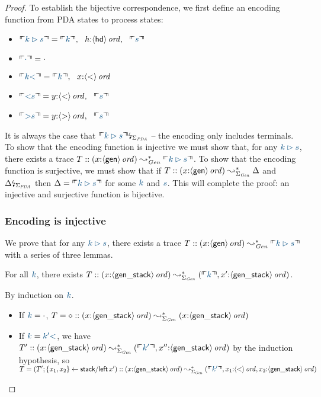 \begin{proof}To establish the bijective correspondence, we first define
an encoding function from PDA states to process states:
\smallskip
\begin{itemize}
\item $\ctxinterp{k \rhd s} = 
  \ctxinterp{k}, ~~
  h{:}\istrue{\susp{\sf hd}}, ~~
  \ctxinterp{s}$
\item $\ctxinterp{\cdot} = \cdot$
\item $\ctxinterp{k{\sf <}} = \ctxinterp{k}, ~~ x{:}\istrue{\susp{\sf <}}$
\item $\ctxinterp{{\sf <}s} = y{:}\istrue{\susp{\sf <}}, ~~ \ctxinterp{s}$
\item $\ctxinterp{{\sf >}s} = y{:}\istrue{\susp{\sf >}}, ~~ \ctxinterp{s}$
\end{itemize}
\smallskip It is always the case that $\restrictsig{\ctxinterp{k \rhd
    s}}{\Sigma_{\it PDA}}$ -- the encoding only includes terminals.
To show that the encoding function is injective we must show that, for
any $\obj{k \rhd s}$, there exists a trace $T ::
(x{:}\istrue{\susp{\sf gen}}) \leadsto^*_{\it Gen} \ctxinterp{k \rhd
  s}$. To show that the encoding function is surjective, we must show
that if $T :: (x{:}{\langle {\sf gen} \rangle}\,{{\it ord}}) \leadsto^*_{\Sigma_{\it
    Gen}} \Delta$ and ${\Delta}{\mbox{\lightning}}_{\Sigma_{\it PDA}}$ then
$\Delta = \ctxinterp{k \rhd s}$ for some $\obj{k}$ and $\obj{s}$. This
will complete the proof: an injective and surjective function is
bijective.

\subsubsection{Encoding is injective}

We prove that for
any $\obj{k \rhd s}$, there exists a trace $T ::
(x{:}\istrue{\susp{\sf gen}}) \leadsto^*_{\it Gen} \ctxinterp{k \rhd
  s}$ with a series of three lemmas.

\begin{lemma} For all $\obj{k}$, there exists
$T :: ({x{:}\istrue{\susp{\sf gen\_stack}}}) \leadsto^*_{\Sigma_{\it Gen}} 
({\ctxinterp{k}, x'{:}\istrue{\susp{\sf gen\_stack}}})$.
\end{lemma}
\noindent
By induction on $\obj{k}$. 
\begin{itemize}
\item If $\obj{k} = \cdot$, $T = \diamond ::
({x{:}{\langle {\sf gen\_stack} \rangle}\,{{\it ord}}}) \leadsto^*_{\Sigma_{\it Gen}} 
(x{:}{\langle {\sf gen\_stack} \rangle}\,{{\it ord}})$
\item If $\obj{k} = \obj{k' {\sf <}}$, we have 
$T' :: ({x{:}\istrue{\susp{\sf gen\_stack}}}) \leadsto^*_{\Sigma_{\it Gen}} 
({\ctxinterp{k'}, x''{:}\istrue{\susp{\sf gen\_stack}}})$ by the induction
hypothesis, so $T = (T'; \trstep{x_1, x_2}{{\sf stack/left}\,x'}) :: 
({x{:}\istrue{\susp{\sf gen\_stack}}}) \leadsto^*_{\Sigma_{\it Gen}} 
({\ctxinterp{k'}, x_1{:}\istrue{\susp{\sf <}}, x_2{:}\istrue{\susp{\sf gen\_stack}}})$
\end{itemize}


\end{proof}
